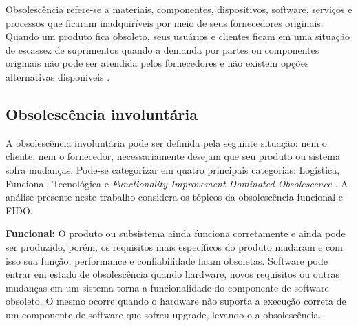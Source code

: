 Obsolescência refere-se a materiais, componentes, dispositivos, software, serviços e processos que ficaram inadquiríveis por meio de seus fornecedores originais. Quando um produto fica obsoleto, seus usuários e clientes ficam em uma situação de escassez de suprimentos quando a demanda por partes ou componentes originais não pode ser atendida pelos fornecedores e não existem opções alternativas disponíveis \cite{COG2005}.

\subsection{\esp Obsolescência involuntária}

A obsolescência involuntária pode ser definida pela seguinte situação: nem o cliente, nem o fornecedor, necessariamente desejam que seu produto ou sistema sofra mudanças. Pode-se categorizar em quatro principais categorias: Logística, Funcional, Tecnológica e \textit{Functionality Improvement Dominated Obsolescence} \cite{sandborn2012}. A análise presente neste trabalho considera os tópicos da obsolescência funcional e FIDO.



\textbf{Funcional:} O produto ou subsistema ainda funciona corretamente e ainda pode ser produzido, porém, os requisitos mais específicos do produto mudaram e com isso sua função, performance e confiabilidade ficam obsoletas.
Software pode entrar em estado de obsolescência quando hardware, novos requisitos ou outras mudanças em um sistema torna a funcionalidade do componente de software obsoleto. O mesmo ocorre quando o hardware não suporta a execução correta de um componente de software que sofreu upgrade, levando-o a obsolescência.


